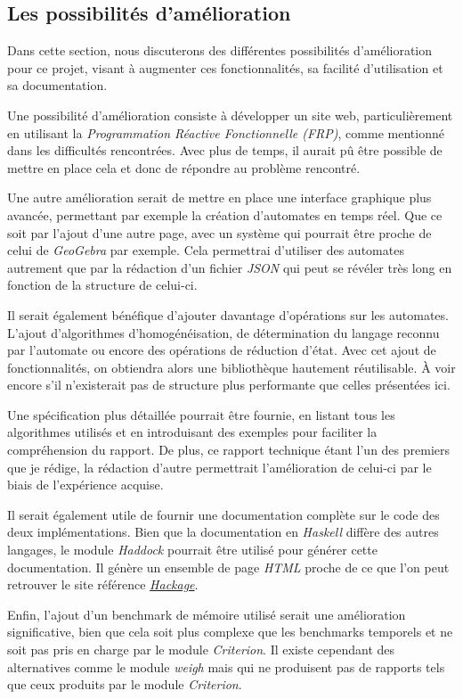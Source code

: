 \subsection{Les possibilités d'amélioration}

Dans cette section, nous discuterons des différentes possibilités d'amélioration
pour ce projet, visant à augmenter ces fonctionnalités, sa facilité
d'utilisation et sa documentation.

Une possibilité d'amélioration consiste à développer un site web,
particulièrement en utilisant la \textit{Programmation Réactive Fonctionnelle
    (FRP)}, comme mentionné dans les difficultés rencontrées. Avec plus de temps, il
aurait pû être possible de mettre en place cela et donc de répondre au problème
rencontré.

\vphantom{}

Une autre amélioration serait de mettre en place une interface graphique plus
avancée, permettant par exemple la création d'automates en temps réel. Que ce
soit par l'ajout d'une autre page, avec un système qui pourrait être proche de
celui de \textit{GeoGebra} par exemple. Cela permettrai d'utiliser des automates
autrement que par la rédaction d'un fichier \textit{JSON} qui peut se révéler
très long en fonction de la structure de celui-ci.

\phantom{}

Il serait également bénéfique d'ajouter davantage d'opérations sur les
automates. L'ajout d'algorithmes d'homogénéisation, de détermination du langage
reconnu par l'automate ou encore des opérations de réduction d'état. Avec cet
ajout de fonctionnalités, on obtiendra alors une bibliothèque hautement
réutilisable. À voir encore s'il n'existerait pas de structure plus performante
que celles présentées ici.

\vphantom{}

Une spécification plus détaillée pourrait être fournie, en listant tous les
algorithmes utilisés et en introduisant des exemples pour faciliter la
compréhension du rapport. De plus, ce rapport technique étant l'un des premiers
que je rédige, la rédaction d'autre permettrait l'amélioration de celui-ci par
le biais de l'expérience acquise.

\vphantom{}

Il serait également utile de fournir une documentation complète sur le code des
deux implémentations. Bien que la documentation en \textit{Haskell} diffère des
autres langages, le module \textit{Haddock} pourrait être utilisé pour générer
cette documentation. Il génère un ensemble de page \textit{HTML} proche de ce
que l'on peut retrouver le site référence
\href{https://hackage.haskell.org/}{\textit{Hackage}}.

\vphantom{}

Enfin, l'ajout d'un benchmark de mémoire utilisé serait une amélioration
significative, bien que cela soit plus complexe que les benchmarks temporels et
ne soit pas pris en charge par le module \textit{Criterion}. Il existe cependant
des alternatives comme le module \textit{weigh} mais qui ne produisent pas de rapports
tels que ceux produits par le module \textit{Criterion}.
